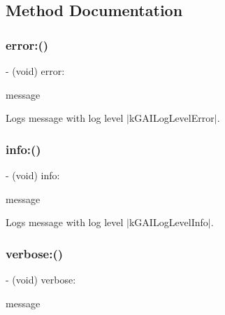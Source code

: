 \subsection{Method Documentation}
\mbox{\label{protocol_g_a_i_logger-p_a8a52b3a59b1aa5319f0c3b41ea5b7e4a}} 
\subsubsection{\texorpdfstring{error\+:()}{error:()}}
{\footnotesize\ttfamily -\/ (void) error\+: \begin{DoxyParamCaption}\item[{(N\+S\+String $\ast$)}]{message }\end{DoxyParamCaption}}

Logs message with log level $\vert$k\+G\+A\+I\+Log\+Level\+Error$\vert$. \mbox{\label{protocol_g_a_i_logger-p_ae558e4ce1a6d65c86abd17a11a698618}} 
\subsubsection{\texorpdfstring{info\+:()}{info:()}}
{\footnotesize\ttfamily -\/ (void) info\+: \begin{DoxyParamCaption}\item[{(N\+S\+String $\ast$)}]{message }\end{DoxyParamCaption}}

Logs message with log level $\vert$k\+G\+A\+I\+Log\+Level\+Info$\vert$. \mbox{\label{protocol_g_a_i_logger-p_a8bc28260ceafda68a72e29baecb9c0c6}} 
\subsubsection{\texorpdfstring{verbose\+:()}{verbose:()}}
{\footnotesize\ttfamily -\/ (void) verbose\+: \begin{DoxyParamCaption}\item[{(N\+S\+String $\ast$)}]{message }\end{DoxyParamCaption}}

